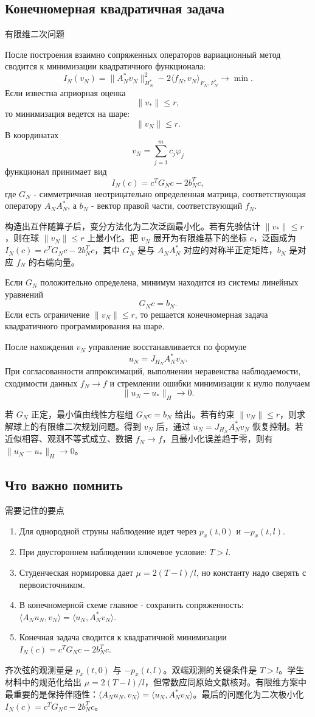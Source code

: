\documentclass[12pt,a4paper]{article}
\newcommand{\zh}[1]{\par\noindent #1\par}
\begin{document}
\subsection*{Конечномерная квадратичная задача}
\zh{有限维二次问题}
После построения взаимно сопряженных операторов вариационный метод сводится к минимизации квадратичного функционала:
\[
 I_N(v_N)=\|A_N^*v_N\|_{H_N^*}^2
 -2\langle f_N,v_N\rangle_{F_N,F_N^*}
 \to\min.
\]
Если известна априорная оценка
\[
 \|v_*\|\le r,
\]
то минимизация ведется на шаре:
\[
 \|v_N\|\le r.
\]
В координатах
\[
 v_N=\sum_{j=1}^m c_j\varphi_j
\]
функционал принимает вид
\[
 I_N(c)=c^TG_Nc-2b_N^Tc,
\]
где $G_N$ - симметричная неотрицательно определенная матрица, соответствующая оператору $A_NA_N^*$, а $b_N$ - вектор правой части, соответствующий $f_N$.
\zh{构造出互伴随算子后，变分方法化为二次泛函最小化。若有先验估计 \(\|v_*\|\le r\)，则在球 \(\|v_N\|\le r\) 上最小化。把 \(v_N\) 展开为有限维基下的坐标 \(c\)，泛函成为 \(I_N(c)=c^TG_Nc-2b_N^Tc\)，其中 \(G_N\) 是与 \(A_NA_N^*\) 对应的对称半正定矩阵，\(b_N\) 是对应 \(f_N\) 的右端向量。}

Если $G_N$ положительно определена, минимум находится из системы линейных уравнений
\[
 G_Nc=b_N.
\]
Если есть ограничение $\|v_N\|\le r$, то решается конечномерная задача квадратичного программирования на шаре.

После нахождения $v_N$ управление восстанавливается по формуле
\[
 u_N=J_{H_N}A_N^*v_N.
\]
При согласованности аппроксимаций, выполнении неравенства наблюдаемости, сходимости данных $f_N\to f$ и стремлении ошибки минимизации к нулю получаем
\[
 \|u_N-u_*\|_H\to0.
\]
\zh{若 \(G_N\) 正定，最小值由线性方程组 \(G_Nc=b_N\) 给出。若有约束 \(\|v_N\|\le r\)，则求解球上的有限维二次规划问题。得到 \(v_N\) 后，通过 \(u_N=J_{H_N}A_N^*v_N\) 恢复控制。若近似相容、观测不等式成立、数据 \(f_N\to f\)，且最小化误差趋于零，则有 \(\|u_N-u_*\|_H\to0\)。}

\subsection*{Что важно помнить}
\zh{需要记住的要点}
\begin{enumerate}
\item Для однородной струны наблюдение идет через $p_x(t,0)$ и $-p_x(t,l)$.
\item При двустороннем наблюдении ключевое условие: $T>l$.
\item Студенческая нормировка дает $\mu=2(T-l)/l$, но константу надо сверять с первоисточником.
\item В конечномерной схеме главное - сохранить сопряженность: $\langle A_Nu_N,v_N\rangle=\langle u_N,A_N^*v_N\rangle$.
\item Конечная задача сводится к квадратичной минимизации $I_N(c)=c^TG_Nc-2b_N^Tc$.
\end{enumerate}
\zh{齐次弦的观测量是 \(p_x(t,0)\) 与 \(-p_x(t,l)\)。双端观测的关键条件是 \(T>l\)。学生材料中的规范化给出 \(\mu=2(T-l)/l\)，但常数应同原始文献核对。有限维方案中最重要的是保持伴随性：\(\langle A_Nu_N,v_N\rangle=\langle u_N,A_N^*v_N\rangle\)。最后的问题化为二次极小化 \(I_N(c)=c^TG_Nc-2b_N^Tc\)。}
\end{document}
